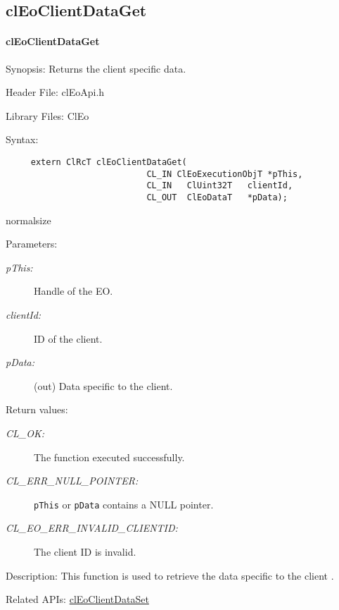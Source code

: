 \begin{flushleft}
  \newpage
\subsection{clEoClientDataGet}
\hypertarget{pageeo109}{}\paragraph{cl\-Eo\-Client\-Data\-Get}\label{pageeo109}
\begin{Desc}
\item[Synopsis:]Returns the client specific data.\end{Desc}
\begin{Desc}
\item[Header File:]clEoApi.h\end{Desc}
\begin{Desc}
\item[Library Files:]Cl\-Eo\end{Desc}
\begin{Desc}
\item[Syntax:]

\footnotesize\begin{verbatim}     extern ClRcT clEoClientDataGet(
                 			CL_IN ClEoExecutionObjT *pThis,
                 			CL_IN   ClUint32T   clientId,
                 			CL_OUT  ClEoDataT   *pData);
\end{verbatim}
  normalsize
\end{Desc}
\begin{Desc}
\item[Parameters:]
\begin{description}
\item[{\em p\-This:}]Handle of the EO. 
\item[{\em client\-Id:}]ID of the client. 
\item[{\em p\-Data:}](out) Data specific to the client.\end{description}
\end{Desc}
\begin{Desc}
\item[Return values:]
\begin{description}
\item[{\em CL\_\-OK:}]The function executed successfully. 
\item[{\em CL\_\-ERR\_\-NULL\_\-POINTER:}]{\tt{pThis}} or {\tt{pData}} contains a NULL pointer. 
\item[{\em CL\_\-EO\_\-ERR\_\-INVALID\_\-CLIENTID:}]The client ID is invalid.\end{description}
\end{Desc}
\begin{Desc}
\item[Description:]This function is used to retrieve the data specific to the client  .\end{Desc}
\begin{Desc}
\item[Related APIs:]\hyperlink{pageeo108}{cl\-Eo\-Client\-Data\-Set} \end{Desc}






\end{flushleft}
